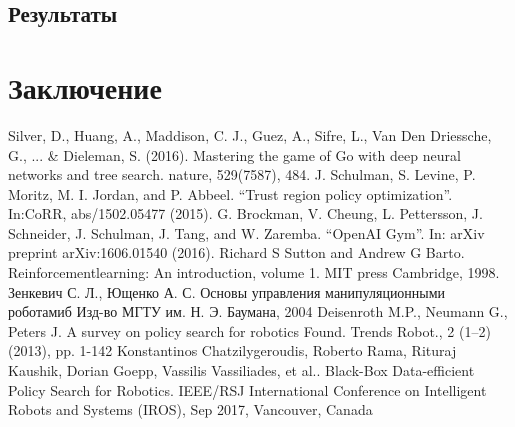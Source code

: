 \documentclass[a4paper,12pt]{article}
\begin{document}
\subsection{Результаты}

\newpage
\section{Заключение}

\newpage
\begin{thebibliography}{9}
     Silver, D., Huang, A., Maddison, C. J., Guez, A., Sifre, L., Van Den Driessche, G., ... & Dieleman, S. (2016). Mastering the game of Go with deep neural networks and tree search. nature, 529(7587), 484.
       J. Schulman, S. Levine, P. Moritz, M. I. Jordan, and P. Abbeel. “Trust region policy optimization”. In:CoRR, abs/1502.05477 (2015).
     G. Brockman, V. Cheung, L. Pettersson, J. Schneider, J. Schulman, J. Tang, and W. Zaremba. “OpenAI Gym”. In: arXiv preprint arXiv:1606.01540 (2016).
     Richard S Sutton and Andrew G Barto. Reinforcementlearning: An introduction, volume 1. MIT press Cambridge, 1998.
     Зенкевич С. Л., Ющенко А. С. Основы управления манипуляционными роботамиб Изд-во МГТУ им. Н. Э. Баумана, 2004
     Deisenroth M.P., Neumann G., Peters J. A survey on policy search for robotics Found. Trends Robot., 2 (1–2) (2013), pp. 1-142
     Konstantinos Chatzilygeroudis, Roberto Rama, Rituraj Kaushik, Dorian Goepp, Vassilis Vassiliades, et al.. Black-Box Data-efficient Policy Search for Robotics. IEEE/RSJ International Conference on Intelligent Robots and Systems (IROS), Sep 2017, Vancouver, Canada

\end{thebibliography}
\end{document}
